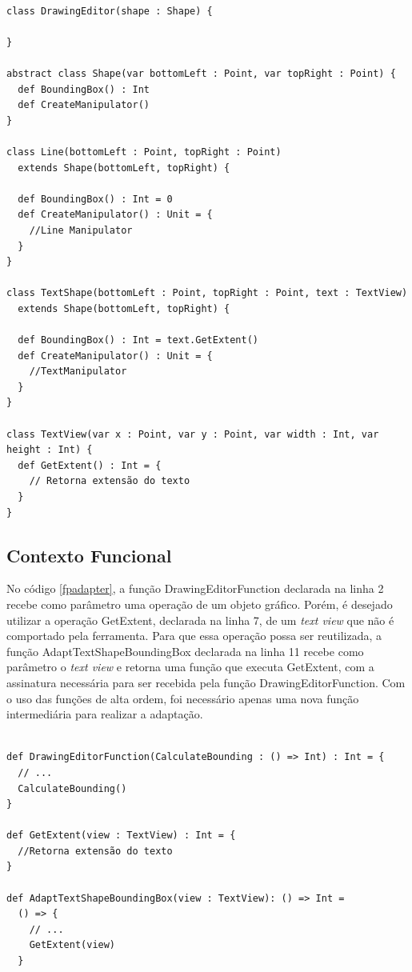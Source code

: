 \begin{lstlisting}[caption={Adapter Orientado a Objetos},label=ooadapter]

class DrawingEditor(shape : Shape) {

}

abstract class Shape(var bottomLeft : Point, var topRight : Point) {
  def BoundingBox() : Int
  def CreateManipulator()
}

class Line(bottomLeft : Point, topRight : Point)
  extends Shape(bottomLeft, topRight) {

  def BoundingBox() : Int = 0
  def CreateManipulator() : Unit = {
    //Line Manipulator
  }
}

class TextShape(bottomLeft : Point, topRight : Point, text : TextView)
  extends Shape(bottomLeft, topRight) {

  def BoundingBox() : Int = text.GetExtent()
  def CreateManipulator() : Unit = {
    //TextManipulator
  }
}

class TextView(var x : Point, var y : Point, var width : Int, var height : Int) {
  def GetExtent() : Int = {
    // Retorna extensão do texto
  }
}

\end{lstlisting}

\subsection*{Contexto Funcional}

No código \ref{fpadapter}, a função DrawingEditorFunction 
declarada na linha 2 recebe como parâmetro uma operação de um 
objeto gráfico. Porém, é desejado utilizar a operação 
GetExtent, declarada na linha 7, de um \textit{text view} 
que não é comportado pela ferramenta. Para que essa 
operação possa ser reutilizada, a função 
AdaptTextShapeBoundingBox declarada na linha 11 
recebe como parâmetro o \textit{text view} e retorna 
uma função que executa GetExtent, com a assinatura 
necessária para ser recebida pela função 
DrawingEditorFunction. Com o uso das funções de alta 
ordem, foi necessário apenas uma nova função intermediária 
para realizar a adaptação. 

\begin{lstlisting}[caption={Adapter Funcional},label=fpadapter]
    
def DrawingEditorFunction(CalculateBounding : () => Int) : Int = {
  // ...
  CalculateBounding()
}

def GetExtent(view : TextView) : Int = {
  //Retorna extensão do texto
}

def AdaptTextShapeBoundingBox(view : TextView): () => Int =
  () => {
    // ...
    GetExtent(view)
  }

\end{lstlisting}
